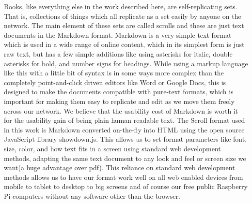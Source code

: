 Books, like everything else in the work described here, are
self-replicating sets. That is, collections of things which all
replicate as a set easily by anyone on the network. The main element of
these sets are called scrolls and these are just text documents in the
Markdown format. Markdown is a very simple text format which is used in
a wide range of online content, which in its simplest form is just raw
text, but has a few simple additions like using asterisks for italic,
double asterisks for bold, and number signs for headings. While using a
markup language like this with a little bit of syntax is in some ways
more complex than the completely point-and-click driven editors like
Word or Google Docs, this is designed to make the documents compatible
with pure-text formats, which is important for making them easy to
replicate and edit as we move them freely across our network. We believe
that the usability cost of Markdown is worth it for the usability gain
of being plain human readable text. The Scroll format used in this work
is Markdown converted on-the-fly into HTML using the open source
JavaScript library showdown.js. This allows us to set format parameters
like font, size, color, and how text fits in a screen using standard web
development methods, adapting the same text document to any look and
feel or screen size we want(a huge advantage over pdf). This reliance on
standard web development methods allows us to have our format work well
on all web enabled devices from mobile to tablet to desktop to big
screens and of course our free public Raspberry Pi computers without any
software other than the browser.

